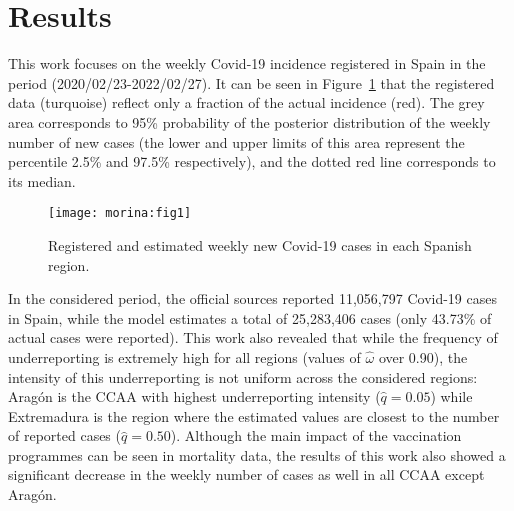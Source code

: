 \documentclass[twoside]{report}
\begin{document}
\section{Results}

This work focuses on the weekly Covid-19 incidence registered in Spain in the period (2020/02/23-2022/02/27). It can be seen in Figure~\ref{morina:fig1} that the registered data (turquoise) reflect only a fraction of the actual incidence (red). The grey area corresponds to 95\% probability of the posterior distribution of the weekly number of new cases (the lower and upper limits of this area represent the percentile 2.5\% and 97.5\% respectively), and the dotted red line corresponds to its median.

\begin{figure}[!ht]\centering
\texttt{[image: morina:fig1]}
\caption{\label{morina:fig1} Registered and estimated weekly new Covid-19 cases in each Spanish region.}
\end{figure}

In the considered period, the official sources reported 11,056,797 Covid-19 cases in Spain, while the model estimates a total of 25,283,406 cases (only 43.73\% of actual cases were reported). This work also revealed that while the frequency of underreporting is extremely high for all regions (values of $\hat{\omega}$ over 0.90), the intensity of this underreporting is not uniform across the considered regions: Arag\'on is the CCAA with highest underreporting intensity ($\hat{q}=0.05$) while Extremadura is the region where the estimated values are closest to the number of reported cases ($\hat{q}=0.50$). Although the main impact of the vaccination programmes can be seen in mortality data, the results of this work also showed a significant decrease in the weekly number of cases as well in all CCAA except Arag\'on.


\end{document}
